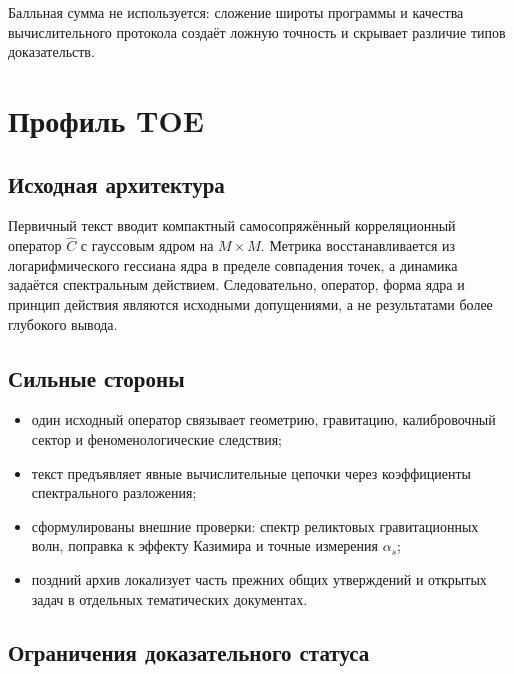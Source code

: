 \documentclass[12pt,a4paper]{article}
\begin{document}
Балльная сумма не используется: сложение широты программы и качества
вычислительного протокола создаёт ложную точность и скрывает различие типов
доказательств.

\section{Профиль TOE}

\subsection{Исходная архитектура}

Первичный текст вводит компактный самосопряжённый корреляционный оператор
$\widehat C$ с гауссовым ядром на $M\times M$. Метрика восстанавливается из
логарифмического гессиана ядра в пределе совпадения точек, а динамика задаётся
спектральным действием. Следовательно, оператор, форма ядра и принцип действия
являются исходными допущениями, а не результатами более глубокого вывода.

\subsection{Сильные стороны}

\begin{itemize}
    \item один исходный оператор связывает геометрию, гравитацию,
    калибровочный сектор и феноменологические следствия;
    \item текст предъявляет явные вычислительные цепочки через коэффициенты
    спектрального разложения;
    \item сформулированы внешние проверки: спектр реликтовых гравитационных
    волн, поправка к эффекту Казимира и точные измерения $\alpha_s$;
    \item поздний архив локализует часть прежних общих утверждений и открытых
    задач в отдельных тематических документах.
\end{itemize}

\subsection{Ограничения доказательного статуса}
\end{document}
